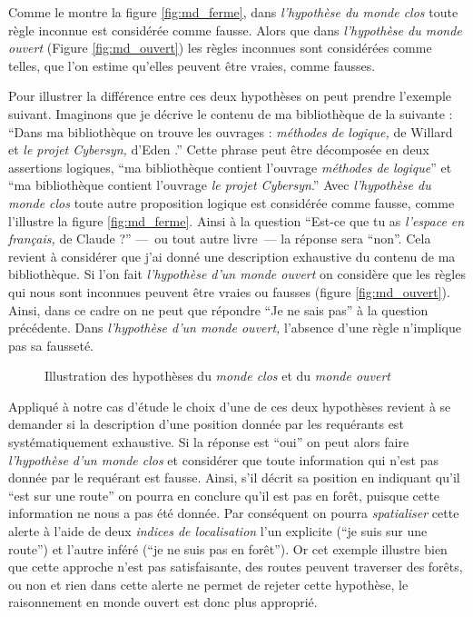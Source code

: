 Comme le montre la figure \ref{fig:md_ferme}, dans \emph{l'hypothèse
  du monde clos} toute règle inconnue est considérée comme
fausse. Alors que dans \emph{l'hypothèse du monde ouvert} (Figure
\ref{fig:md_ouvert}) les règles inconnues sont considérées comme
telles, \ie que l'on estime qu'elles peuvent être vraies, comme
fausses.

Pour illustrer la différence entre ces deux hypothèses on peut prendre
l'exemple suivant. Imaginons que je décrive le contenu de ma
bibliothèque de la suivante : \enquote{Dans ma bibliothèque on trouve
  les ouvrages : \emph{méthodes de logique,} de Willard  et
  \emph{le projet \emph{Cybersyn},} d'Eden .} Cette phrase
peut être décomposée en deux assertions logiques, \enquote{ma
  bibliothèque contient l'ouvrage \emph{méthodes de logique}} et
\enquote{ma bibliothèque contient l'ouvrage \emph{le projet
    \emph{Cybersyn}}.} Avec \emph{l'hypothèse du monde clos} toute
autre proposition logique est considérée comme fausse, comme
l'illustre la figure \ref{fig:md_ferme}. Ainsi à la question
\enquote{Est-ce que tu as \emph{l'espace en français,} de Claude
   ?} ---~ou tout autre livre~--- la réponse sera
\enquote{non}. Cela revient à considérer que j'ai donné une
description exhaustive du contenu de ma bibliothèque. Si l'on fait
\emph{l'hypothèse d'un monde ouvert} on considère que les règles qui
nous sont inconnues peuvent être vraies ou fausses (figure
\ref{fig:md_ouvert}). Ainsi, dans ce cadre on ne peut que répondre
\enquote{Je ne sais pas} à la question précédente. Dans
\emph{l'hypothèse d'un monde ouvert,} l’absence d'une règle n'implique
pas sa fausseté.

\begin{figure}
  \centering
  \hspace{3cm}
  \caption{Illustration des hypothèses du \emph{monde clos} et du
    \emph{monde ouvert}}
  \label{fig:comp_md}
\end{figure}

Appliqué à notre cas d'étude le choix d'une de ces deux hypothèses
revient à se demander si la description d'une position donnée par les
requérants est systématiquement exhaustive. Si la réponse est
\enquote{oui} on peut alors faire \emph{l'hypothèse d'un monde clos}
et considérer que toute information qui n'est pas donnée par le
requérant est fausse. Ainsi, s'il décrit sa position en indiquant
qu'il \enquote{est sur une route} on pourra en conclure qu'il est pas
en forêt, puisque cette information ne nous a pas été donnée. Par
conséquent on pourra \emph{spatialiser} cette alerte à l'aide de deux
\emph{indices de localisation} l'un explicite (\enquote{je suis sur
  une route}) et l'autre inféré (\enquote{je ne suis pas en
  forêt}). Or cet exemple illustre bien que cette approche n'est pas
satisfaisante, des routes peuvent traverser des forêts, ou non et rien
dans cette alerte ne permet de rejeter cette hypothèse, le
raisonnement en monde ouvert est donc plus approprié.

